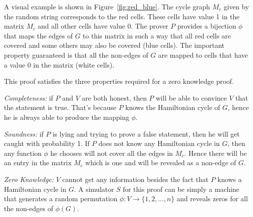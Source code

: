 A visual example is shown in Figure~\ref{fig:red_blue}. The cycle graph $M_c$ given by the
random string corresponds to the red cells. These cells have value 1 in the matrix $M_c$ and
all other cells have value 0. The prover $P$ provides a bijection $\phi$ that
maps the edges of $G$ to this matrix in such a way that all red cells are covered and
some others may also be covered (blue cells). The important property guaranteed is that
all the non-edges of $G$ are mapped to cells that have a value 0 in the matrix (white cells).

This proof satisfies the three properties required for a zero knowledge proof.

\textit{Completeness:} if $P$ and $V$ are both honest, then $P$ will be able to convince
$V$ that the statement is true. That's because $P$ knows the Hamiltonian cycle of $G$,
hence he is always able to produce the mapping $\phi$.

\textit{Soundness:} if $P$ is lying and trying to prove a false statement, then he will
get caught with probability 1. If $P$ does not know any Hamiltonian cycle in $G$, then
any function $\phi$ he chooses will not cover all the edges in $M_c$. Hence there will
be an entry in the matrix $M_c$ which is one and will be revealed as a non-edge of $G$.

\textit{Zero Knowledge:} $V$ cannot get any information besides the fact that $P$
knows a Hamiltonian cycle in $G$. A simulator $S$ for this proof can be simply a machine
that generates a random permutation $\phi:V\rightarrow \{1,2,\ldots,n\}$ and reveals zeros
for all the non-edges of $\phi(G)$.

\vspace{5mm}